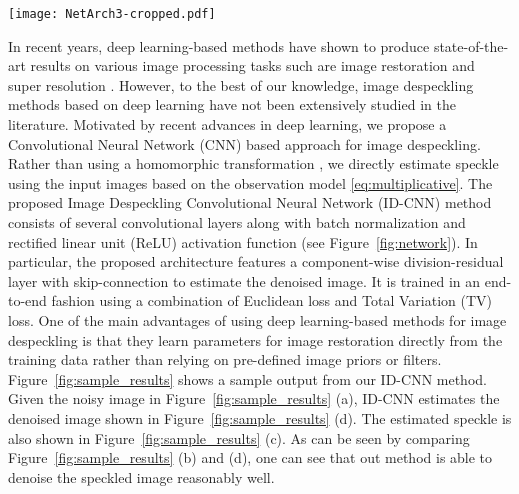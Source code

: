 \documentclass[journal]{IEEEtran}
\begin{document}
\begin{figure*}[t]
	\centering
	\texttt{[image: NetArch3-cropped.pdf]}
	\caption{Proposed  ID-CNN network architecture for image despeckling.}
	\label{fig:network}
\end{figure*}


In recent years, deep learning-based methods have shown to produce state-of-the-art results on various image processing tasks such are image restoration \cite{cnn, cnnderain} and super resolution \cite{cnnsuper}.    However, to the best of our knowledge, image despeckling methods based on deep learning have not been extensively studied in the literature.   Motivated by recent advances in deep learning, we propose a Convolutional Neural Network (CNN) based approach for image despeckling.  Rather than using a homomorphic transformation \cite{Despeckle_MCA}, we directly estimate speckle using the input images based on the observation model \eqref{eq:multiplicative}.  The proposed  Image Despeckling Convolutional Neural Network (ID-CNN) method consists of several convolutional layers along with batch normalization \cite{batch_normalization} and rectified linear unit (ReLU) \cite{imagenet} activation function (see Figure~\ref{fig:network}).  In particular, the proposed architecture features a component-wise division-residual layer with skip-connection to estimate the denoised image.   It is trained in an end-to-end fashion using a combination of Euclidean loss and Total Variation (TV) loss.  One of the main advantages of using deep learning-based methods for image despeckling is that they learn parameters for image restoration directly from the training data rather than relying on pre-defined image priors or filters.
Figure~\ref{fig:sample_results} shows a sample output from our ID-CNN method.  Given the noisy image in Figure~\ref{fig:sample_results} (a), ID-CNN estimates the denoised image shown in Figure~\ref{fig:sample_results} (d).  The estimated speckle is also shown in Figure~\ref{fig:sample_results} (c).  As can be seen by comparing Figure~\ref{fig:sample_results} (b) and (d), one can see that out method is able to denoise the speckled image reasonably well. 
\end{document}
